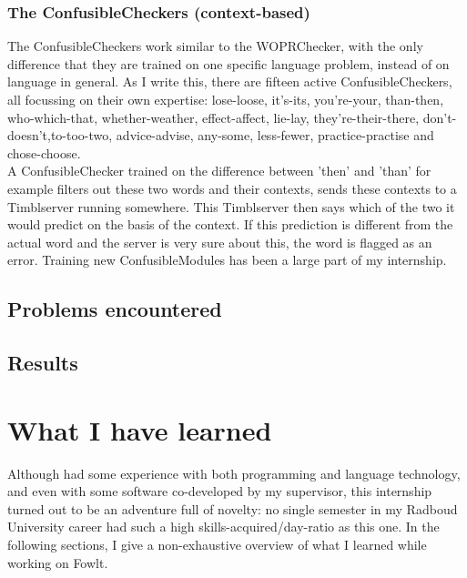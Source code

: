 \documentclass[12pt]{article}
\begin{document}
\subsubsection{The ConfusibleCheckers (context-based)}
The ConfusibleCheckers work similar to the WOPRChecker, with the only difference that they are trained on one specific language problem, instead of on language in general. As I write this, there are fifteen active ConfusibleCheckers, all focussing on their own expertise: lose-loose, it's-its, you're-your, than-then, who-which-that, whether-weather, effect-affect, lie-lay, they're-their-there, don't-doesn't,to-too-two, advice-advise, any-some, less-fewer, practice-practise and chose-choose.
\\\indent
A ConfusibleChecker trained on the difference between 'then' and 'than' for example filters out these two words and their contexts, sends these contexts to a Timblserver running somewhere. This Timblserver then says which of the two it would predict on the basis of the context. If this prediction is different from the actual word and the server is very sure about this, the word is flagged as an error. Training new ConfusibleModules has been a large part of my internship.

\subsection{Problems encountered}
\subsection{Results}

\section{What I have learned}
Although had some experience with both programming and language technology, and even with some software co-developed by my supervisor, this internship turned out to be an adventure full of novelty: no single semester in my Radboud University career had such a high skills-acquired/day-ratio as this one. In the following sections, I give a non-exhaustive overview of what I learned while working on Fowlt.
\end{document}
